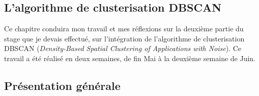 \documentclass[12pt]{report}
\begin{document}
\begin{spacing}{1.2}
\chapter{L'algorithme de clusterisation DBSCAN}

Ce chapitre conduira mon travail et mes réflexions sur la deuxième partie du stage que je devais effectué, sur l'intégration de l'algorithme de clusterisation DBSCAN (\textit{Density-Based Spatial Clustering of Applications with Noise}).
\newline
Ce travail a été réalisé en deux semaines, de fin Mai à la deuxième semaine de Juin.

\section{Présentation générale}


\end{spacing}
\end{document}
